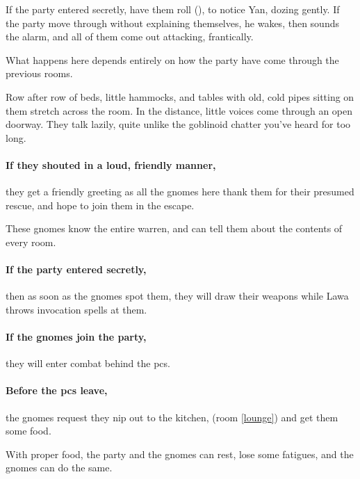 \begin{multicols}{2}

If the party entered secretly, have them roll  (\tn[8]), to notice Yan, dozing gently.
If the party move through without explaining themselves, he wakes, then sounds the alarm, and all of them come out attacking, frantically.


What happens here depends entirely on how the party have come through the previous rooms.

\begin{boxtext}
  Row after row of beds, little hammocks, and tables with old, cold pipes sitting on them stretch across the room.
  In the distance, little voices come through an open doorway.
  They talk lazily, quite unlike the goblinoid chatter you've heard for too long.
\end{boxtext}

\paragraph{If they shouted in a loud, friendly manner,}
they get a friendly greeting as all the gnomes here thank them for their presumed rescue, and hope to join them in the escape.

These gnomes know the entire \gls{warren}, and can tell them about the contents of every room.

\paragraph{If the party entered secretly,}
then as soon as the gnomes spot them, they will draw their weapons while Lawa throws invocation spells at them.

\paragraph{If the gnomes join the party,}
they will enter combat behind the \glspl{pc}.

\paragraph{Before the \glspl{pc} leave,}
the gnomes request they nip out to the kitchen, (room \vref{lounge}) and get them some food.

With proper food, the party and the gnomes can rest, lose some \glspl{fatigue}, and the gnomes can do the same.


\end{multicols}
